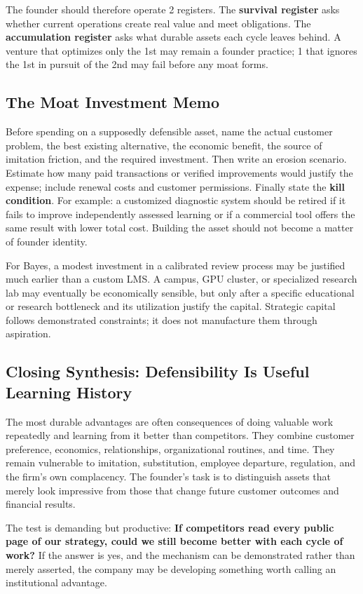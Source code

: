 The founder should therefore operate 2 registers. The \textbf{survival register} asks whether current operations create real value and meet obligations. The \textbf{accumulation register} asks what durable assets each cycle leaves behind. A venture that optimizes only the 1st may remain a founder practice; 1 that ignores the 1st in pursuit of the 2nd may fail before any moat forms.

\subsection{The Moat Investment Memo}
\label{sec:moat_investment_memo}

Before spending on a supposedly defensible asset, name the actual customer problem, the best existing alternative, the economic benefit, the source of imitation friction, and the required investment. Then write an erosion scenario. Estimate how many paid transactions or verified improvements would justify the expense; include renewal costs and customer permissions. Finally state the \textbf{kill condition}. For example: a customized diagnostic system should be retired if it fails to improve independently assessed learning or if a commercial tool offers the same result with lower total cost. Building the asset should not become a matter of founder identity.

For Bayes, a modest investment in a calibrated review process may be justified much earlier than a custom LMS. A campus, GPU cluster, or specialized research lab may eventually be economically sensible, but only after a specific educational or research bottleneck and its utilization justify the capital. Strategic capital follows demonstrated constraints; it does not manufacture them through aspiration.

\subsection{Closing Synthesis: Defensibility Is Useful Learning History}
\label{sec:closing_synthesis_useful_learning}

The most durable advantages are often consequences of doing valuable work repeatedly and learning from it better than competitors. They combine customer preference, economics, relationships, organizational routines, and time. They remain vulnerable to imitation, substitution, employee departure, regulation, and the firm's own complacency. The founder's task is to distinguish assets that merely look impressive from those that change future customer outcomes and financial results.

The test is demanding but productive: \textbf{If competitors read every public page of our strategy, could we still become better with each cycle of work?} If the answer is yes, and the mechanism can be demonstrated rather than merely asserted, the company may be developing something worth calling an institutional advantage.
